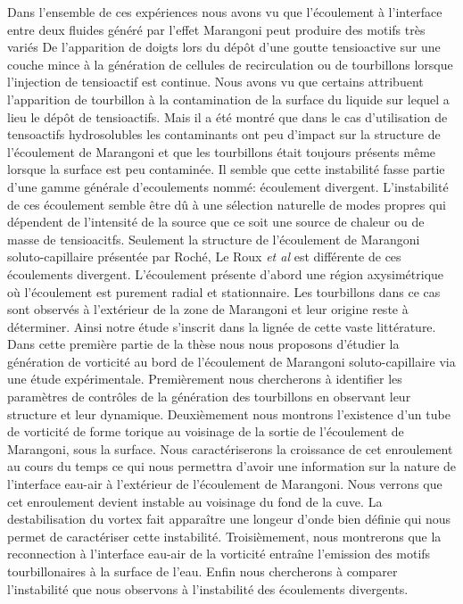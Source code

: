 Dans l'ensemble de ces expériences nous avons vu que l'écoulement à l'interface entre deux fluides généré par l'effet Marangoni peut produire des motifs très variés De l'apparition de doigts lors du dépôt d'une goutte tensioactive sur une couche mince à la génération de cellules de recirculation ou de tourbillons lorsque l'injection de tensioactif est continue. Nous avons vu que certains attribuent l'apparition de tourbillon à la contamination de la surface du liquide sur lequel a lieu le dépôt de tensioactifs. Mais il a été montré que dans le cas d'utilisation de tensoactifs hydrosolubles les contaminants ont peu d'impact sur la structure de l'écoulement de Marangoni et que les tourbillons était toujours présents même lorsque la surface est peu contaminée. Il semble que cette instabilité fasse partie d'une gamme générale d'ecoulements nommé: écoulement divergent. L'instabilité de ces écoulement semble être dû à une sélection naturelle de modes propres qui dépendent de l'intensité de la source que ce soit une source de chaleur ou de masse de tensioacitfs. Seulement la structure de l'écoulement de Marangoni soluto-capillaire présentée par Roché, Le Roux \textit{et al} est différente de ces écoulements divergent. L'écoulement présente d'abord une région axysimétrique où l'écoulement est purement radial et stationnaire. Les tourbillons dans ce cas sont observés à l'extérieur de la zone de Marangoni et leur origine reste à déterminer. Ainsi notre étude s'inscrit dans la lignée de cette vaste littérature. Dans cette première partie de la thèse nous nous proposons d'étudier la génération de vorticité au bord de l'écoulement de Marangoni soluto-capillaire via une étude expérimentale. Premièrement nous chercherons à identifier les paramètres de contrôles de la génération des tourbillons en observant leur structure et leur dynamique. Deuxièmement nous montrons l'existence d'un tube de vorticité de forme torique au voisinage de la sortie de l'écoulement de Marangoni, sous la surface. Nous caractériserons la croissance de cet enroulement au cours du temps ce qui nous permettra d'avoir une information sur la nature de l'interface eau-air à l'extérieur de l'écoulement de Marangoni. Nous verrons que cet enroulement devient instable au voisinage du fond de la cuve. La destabilisation du vortex fait apparaître une longeur d'onde bien définie qui nous permet de caractériser cette instabilité. Troisièmement, nous montrerons que la reconnection à l'interface eau-air de la vorticité entraîne l'emission des motifs tourbillonaires à la surface de l'eau. Enfin nous chercherons à comparer l'instabilité que nous observons à l'instabilité des écoulements divergents.
